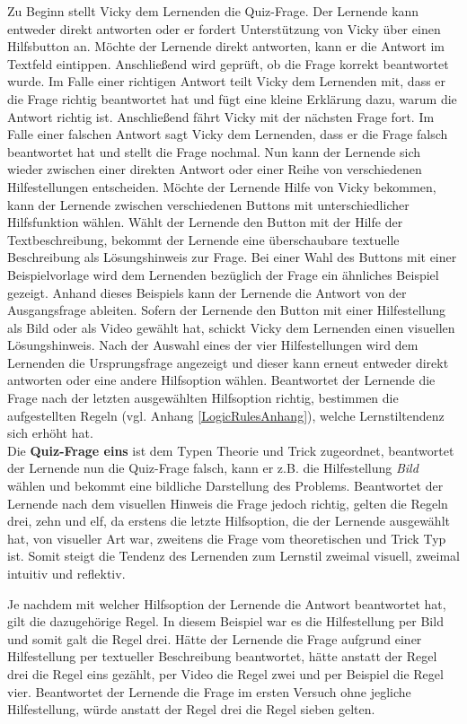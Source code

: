 Zu Beginn stellt Vicky dem Lernenden die Quiz-Frage. 
Der Lernende kann entweder direkt antworten oder er fordert Unterstützung von Vicky über einen 
Hilfsbutton an.
Möchte der Lernende direkt antworten, kann er die Antwort im Textfeld eintippen.
Anschließend wird geprüft, ob die Frage korrekt beantwortet wurde. Im Falle einer richtigen Antwort teilt Vicky dem Lernenden mit,
dass er die Frage richtig beantwortet hat und fügt eine kleine Erklärung dazu, warum die Antwort richtig ist. Anschließend 
fährt Vicky mit der nächsten Frage fort.
Im Falle einer falschen Antwort sagt Vicky dem Lernenden, dass er die Frage falsch beantwortet hat und 
stellt die Frage nochmal. Nun kann der Lernende sich wieder zwischen einer direkten Antwort oder einer Reihe von 
verschiedenen Hilfestellungen entscheiden. Möchte der Lernende Hilfe von Vicky bekommen, kann der Lernende
zwischen verschiedenen Buttons mit unterschiedlicher Hilfsfunktion wählen. 
Wählt der Lernende den Button mit der Hilfe der Textbeschreibung, bekommt der Lernende eine 
überschaubare textuelle Beschreibung als Lösungshinweis zur Frage. 
Bei einer Wahl des Buttons mit einer Beispielvorlage wird dem Lernenden bezüglich der Frage
ein ähnliches Beispiel gezeigt. Anhand dieses Beispiels kann der Lernende die Antwort von der Ausgangsfrage
ableiten.
Sofern der Lernende den Button mit einer Hilfestellung als Bild oder als Video gewählt hat, schickt Vicky dem Lernenden 
einen visuellen Lösungshinweis. 
Nach der Auswahl eines der vier Hilfestellungen wird dem Lernenden die Ursprungsfrage angezeigt und dieser kann erneut 
entweder direkt antworten oder eine andere Hilfsoption wählen. 
Beantwortet der Lernende die Frage nach der letzten ausgewählten Hilfsoption richtig, bestimmen die aufgestellten 
Regeln (vgl. Anhang \ref{LogicRulesAnhang}), welche Lernstiltendenz sich erhöht hat.\\
Die \textbf{Quiz-Frage eins} ist dem Typen Theorie und Trick zugeordnet, 
beantwortet der Lernende nun die Quiz-Frage falsch, kann er
z.B. die Hilfestellung \textit{Bild} wählen und bekommt eine bildliche Darstellung
des Problems.
Beantwortet der Lernende nach dem visuellen Hinweis die Frage jedoch richtig, 
gelten die Regeln drei, zehn und elf,
da erstens die letzte Hilfsoption, die der Lernende ausgewählt hat, von visueller Art war, zweitens 
die Frage vom theoretischen und Trick Typ ist. 
Somit steigt die Tendenz des Lernenden zum Lernstil zweimal visuell, zweimal intuitiv und reflektiv. 

Je nachdem mit welcher Hilfsoption der Lernende die Antwort beantwortet hat, gilt die dazugehörige Regel.
In diesem Beispiel war es die Hilfestellung per Bild und somit galt die Regel drei. Hätte der Lernende 
die Frage aufgrund einer Hilfestellung per textueller Beschreibung beantwortet, hätte anstatt der Regel drei die Regel eins 
gezählt, per Video die Regel zwei und per Beispiel die Regel vier.
Beantwortet der Lernende die Frage im ersten Versuch ohne jegliche Hilfestellung, würde anstatt der Regel drei die Regel sieben gelten.

